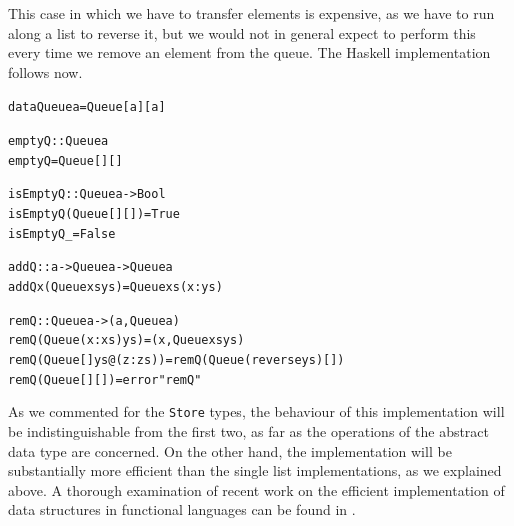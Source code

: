 This case in which we have to transfer elements is expensive, as we have to run
along a list to reverse it,
but we would not in general expect to perform this every
time we remove an element from the queue.
The Haskell implementation follows now.
\begin{alltt}
data Queue a = Queue [a] [a]

emptyQ :: Queue a
emptyQ = Queue [] []

isEmptyQ :: Queue a -> Bool
isEmptyQ (Queue [] []) = True
isEmptyQ _             = False

addQ   :: a -> Queue a -> Queue a
addQ x (Queue xs ys) = Queue xs (x:ys)

remQ   :: Queue a -> (  a , Queue a )
remQ (Queue (x:xs) ys)    = (x , Queue xs ys)
remQ (Queue [] ys@(z:zs)) = remQ (Queue (reverse ys) [])
remQ (Queue [] [])        = error "remQ"
\end{alltt}
As we commented for the \texttt{Store} types, the behaviour of this implementation
will be indistinguishable from the first two, as far as the operations of the
abstract data type
are concerned. On the other hand, the implementation will be
substantially more efficient than the single list implementations, as we
explained above. A thorough examination of recent work on the efficient implementation
of data structures in functional languages  can be found in .


